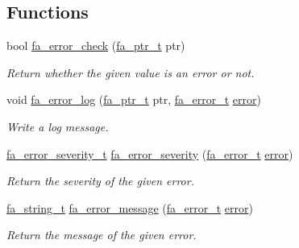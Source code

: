 \subsection*{Functions}
\begin{DoxyCompactItemize}
\item 
bool \hyperlink{group___fa_error_gab7550192e471f82582ecb441949c8b62}{fa\-\_\-error\-\_\-check} (\hyperlink{group___fa_ga915ddeae99ad7568b273d2b876425197}{fa\-\_\-ptr\-\_\-t} ptr)
\begin{DoxyCompactList}\small\item\em Return whether the given value is an error or not. \end{DoxyCompactList}\item 
void \hyperlink{group___fa_error_ga466e0539bedb29f68527448ed9ba11bf}{fa\-\_\-error\-\_\-log} (\hyperlink{group___fa_ga915ddeae99ad7568b273d2b876425197}{fa\-\_\-ptr\-\_\-t} ptr, \hyperlink{group___fa_error_ga4a4feb4d3686657ac8dbd2be421cbb15}{fa\-\_\-error\-\_\-t} \hyperlink{group___fa_error_gga5cf5c13f1e12ae6b125c0265f59f4d82ad606e435413ea0944dd00d49e901e4ed}{error})
\begin{DoxyCompactList}\small\item\em Write a log message. \end{DoxyCompactList}\item 
\hyperlink{group___fa_error_ga5cf5c13f1e12ae6b125c0265f59f4d82}{fa\-\_\-error\-\_\-severity\-\_\-t} \hyperlink{group___fa_error_ga260bea83fbb420ad257323648c86cd15}{fa\-\_\-error\-\_\-severity} (\hyperlink{group___fa_error_ga4a4feb4d3686657ac8dbd2be421cbb15}{fa\-\_\-error\-\_\-t} \hyperlink{group___fa_error_gga5cf5c13f1e12ae6b125c0265f59f4d82ad606e435413ea0944dd00d49e901e4ed}{error})
\begin{DoxyCompactList}\small\item\em Return the severity of the given error. \end{DoxyCompactList}\item 
\hyperlink{group___fa_string_gacada63033b77bc6c39fa632ae199349b}{fa\-\_\-string\-\_\-t} \hyperlink{group___fa_error_ga8539a91f951952f94c4270a0f04f6ad1}{fa\-\_\-error\-\_\-message} (\hyperlink{group___fa_error_ga4a4feb4d3686657ac8dbd2be421cbb15}{fa\-\_\-error\-\_\-t} \hyperlink{group___fa_error_gga5cf5c13f1e12ae6b125c0265f59f4d82ad606e435413ea0944dd00d49e901e4ed}{error})
\begin{DoxyCompactList}\small\item\em Return the message of the given error. \end{DoxyCompactList}\item 

\end{DoxyCompactItemize}
